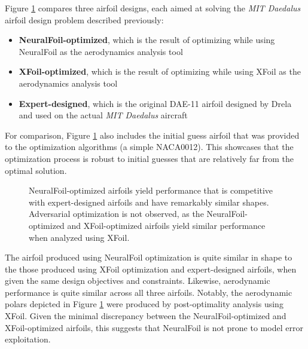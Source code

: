 \documentclass[conf]{new-aiaa}
\begin{document}
    Figure \ref{fig:daedalus_optimized} compares three airfoil designs, each aimed at solving the \emph{MIT Daedalus} airfoil design problem described previously:

    \begin{itemize}
        \item \textbf{NeuralFoil-optimized}, which is the result of optimizing while using NeuralFoil as the aerodynamics analysis tool
        \item \textbf{XFoil-optimized}, which is the result of optimizing while using XFoil as the aerodynamics analysis tool
        \item \textbf{Expert-designed}, which is the original DAE-11 airfoil designed by Drela \cite{drela_lowreynoldsnumber_1988} and used on the actual \emph{MIT Daedalus} aircraft
    \end{itemize}

    For comparison, Figure \ref{fig:daedalus_optimized} also includes the initial guess airfoil that was provided to the optimization algorithms (a simple NACA0012). This showcases that the optimization process is robust to initial guesses that are relatively far from the optimal solution.

    \begin{figure}[h]
        \centering
        
        \caption{NeuralFoil-optimized airfoils yield performance that is competitive with expert-designed airfoils and have remarkably similar shapes. Adversarial optimization is not observed, as the NeuralFoil-optimized and XFoil-optimized airfoils yield similar performance when analyzed using XFoil.}
        \label{fig:daedalus_optimized}
    \end{figure}

    The airfoil produced using NeuralFoil optimization is quite similar in shape to the those produced using XFoil optimization and expert-designed airfoils, when given the same design objectives and constraints. Likewise, aerodynamic performance is quite similar across all three airfoils. Notably, the aerodynamic polars depicted in Figure \ref{fig:daedalus_optimized} were produced by post-optimality analysis using XFoil. Given the minimal discrepancy between the NeuralFoil-optimized and XFoil-optimized airfoils, this suggests that NeuralFoil is not prone to model error exploitation.
\end{document}
